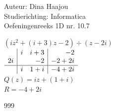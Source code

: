 \documentclass[a4paper]{article}
\begin{document}
\noindent \large Auteur: Dina Haajou \\
\noindent \large Studierichting: Informatica \\
\noindent \large Oefeningenreeks 1D nr. 10.7 \\

\normalsize

$ (iz^2 + (i + 3)z - 2) \div (z - 2i) $ \\

$ \begin{array}{r|rr|r}
 & i & i + 3 & -2 \\
2i & & -2 & -2 + 2i \\ \hline
 & i & 1 + i & -4 + 2i \\
\end{array} $ \\

$Q(z) =  iz + (1 + i) $ \\

$R = -4 + 2i $ \\

\begin{thebibliography}{999}
\end{thebibliography}
\end{document}
